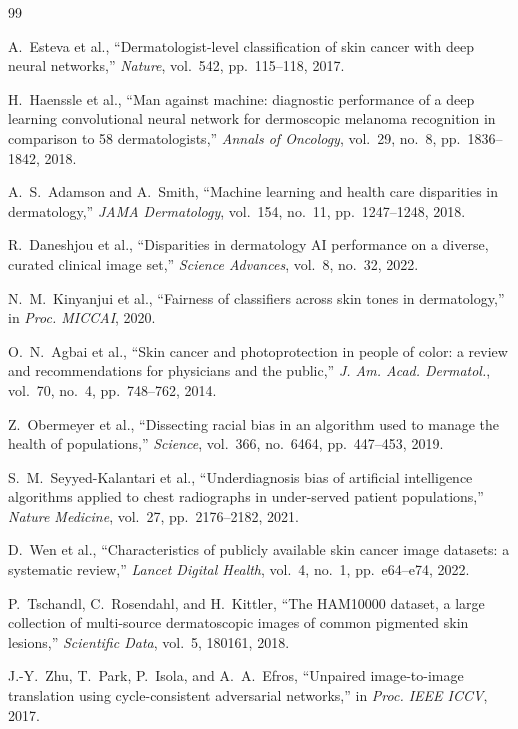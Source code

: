 \documentclass[10pt, twocolumn, letterpaper]{article}
\begin{document}

\begin{thebibliography}{99}

 A.~Esteva et al., ``Dermatologist-level classification of skin cancer with deep neural networks,'' \textit{Nature}, vol.~542, pp.~115--118, 2017.

 H.~Haenssle et al., ``Man against machine: diagnostic performance of a deep learning convolutional neural network for dermoscopic melanoma recognition in comparison to 58 dermatologists,'' \textit{Annals of Oncology}, vol.~29, no.~8, pp.~1836--1842, 2018.

 A.~S.~Adamson and A.~Smith, ``Machine learning and health care disparities in dermatology,'' \textit{JAMA Dermatology}, vol.~154, no.~11, pp.~1247--1248, 2018.

 R.~Daneshjou et al., ``Disparities in dermatology AI performance on a diverse, curated clinical image set,'' \textit{Science Advances}, vol.~8, no.~32, 2022.

 N.~M.~Kinyanjui et al., ``Fairness of classifiers across skin tones in dermatology,'' in \textit{Proc. MICCAI}, 2020.

 O.~N.~Agbai et al., ``Skin cancer and photoprotection in people of color: a review and recommendations for physicians and the public,'' \textit{J. Am. Acad. Dermatol.}, vol.~70, no.~4, pp.~748--762, 2014.

 Z.~Obermeyer et al., ``Dissecting racial bias in an algorithm used to manage the health of populations,'' \textit{Science}, vol.~366, no.~6464, pp.~447--453, 2019.

 S.~M.~Seyyed-Kalantari et al., ``Underdiagnosis bias of artificial intelligence algorithms applied to chest radiographs in under-served patient populations,'' \textit{Nature Medicine}, vol.~27, pp.~2176--2182, 2021.

 D.~Wen et al., ``Characteristics of publicly available skin cancer image datasets: a systematic review,'' \textit{Lancet Digital Health}, vol.~4, no.~1, pp.~e64--e74, 2022.

 P.~Tschandl, C.~Rosendahl, and H.~Kittler, ``The HAM10000 dataset, a large collection of multi-source dermatoscopic images of common pigmented skin lesions,'' \textit{Scientific Data}, vol.~5, 180161, 2018.

 J.-Y.~Zhu, T.~Park, P.~Isola, and A.~A.~Efros, ``Unpaired image-to-image translation using cycle-consistent adversarial networks,'' in \textit{Proc. IEEE ICCV}, 2017.


\end{thebibliography}
\end{document}

